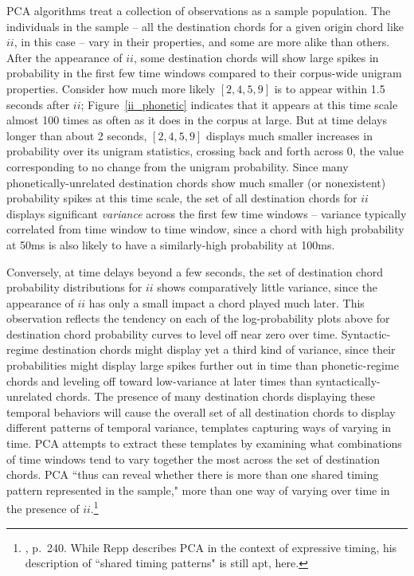 PCA algorithms treat a collection of observations as a sample population.  The individuals in the sample -- all the destination chords for a given origin chord like $ii$, in this case -- vary in their properties, and some are more alike than others.  After the appearance of $ii$, some destination chords will show large spikes in probability in the first few time windows compared to their corpus-wide unigram properties.  Consider how much more likely $[2,4,5,9]$ is to appear within 1.5 seconds after $ii$; Figure~\ref{ii_phonetic} indicates that it appears at this time scale almost 100 times as often as it does in the corpus at large.  But at time delays longer than about 2 seconds, $[2,4,5,9]$ displays much smaller increases in probability over its unigram statistics, crossing back and forth across 0, the value corresponding to no change from the unigram probability.  Since many phonetically-unrelated destination chords show much smaller (or nonexistent) probability spikes at this time scale, the set of all destination chords for $ii$ displays significant \emph{variance} across the first few time windows -- variance typically correlated from time window to time window, since a chord with high probability at 50ms is also likely to have a similarly-high probability at 100ms.

Conversely, at time delays beyond a few seconds, the set of destination chord probability distributions for $ii$ shows comparatively little variance, since the appearance of $ii$ has only a small impact a chord played much later.  This observation reflects the tendency on each of the log-probability plots above for destination chord probability curves to level off near zero over time.  Syntactic-regime destination chords might display yet a third kind of variance, since their probabilities might display large spikes further out in time than phonetic-regime chords and leveling off toward low-variance at later times than syntactically-unrelated chords.  The presence of many destination chords displaying these temporal behaviors will cause the overall set of all destination chords to display different patterns of temporal variance, templates capturing ways of varying in time.  PCA attempts to extract these templates by examining what combinations of time windows tend to vary together the most across the set of destination chords.  PCA ``thus can reveal whether there is more than one shared timing pattern represented in the sample," more than one way of varying over time in the presence of $ii$.\footnote{\cite{repp1992}, p.\ 240.  While Repp describes PCA in the context of expressive timing, his description of ``shared timing patterns" is still apt, here.}

